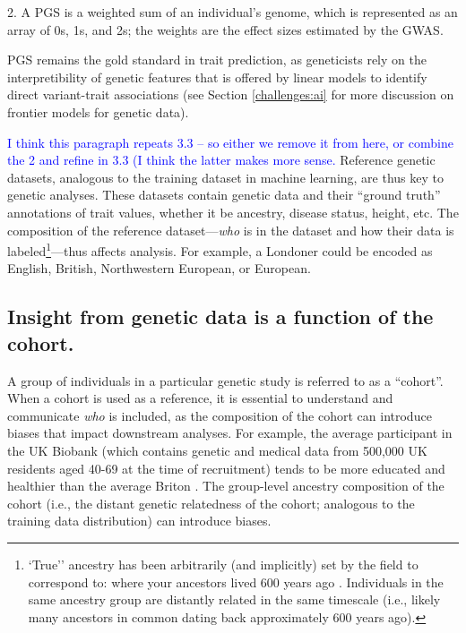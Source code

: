 2. A PGS is a weighted sum of an individual's genome, which is represented as an array of 0s, 1s, and 2s; the weights are the effect sizes estimated by the GWAS.

PGS remains the gold standard in trait prediction, as geneticists rely on the interpretibility of genetic features that is offered by linear models to identify direct variant-trait associations (see Section \ref{challenges:ai} for more discussion on frontier models for genetic data)\cite{fritzsche_ethical_2023}.



\textcolor{blue}{I think this paragraph repeats 3.3 -- so either we remove it from here, or combine the 2 and refine in 3.3 (I think the latter makes more sense.}  Reference genetic datasets, analogous to the training dataset in machine learning, are thus key to genetic analyses. These datasets contain genetic data and their ``ground truth'' annotations of trait values, whether it be ancestry, disease status, height, etc. The composition of the reference dataset—\emph{who} is in the dataset and how their data is labeled\footnote{`True'' ancestry has been arbitrarily (and implicitly) set by the field to correspond to: where your ancestors lived 600 years ago \cite{coop_genetic_2023}. Individuals in the same ancestry group are distantly related in the same timescale (i.e., likely many ancestors in common dating back approximately 600 years ago). }—thus affects analysis. For example, a Londoner could be encoded as English, British, Northwestern European, or European.



\subsection{Insight from genetic data is a function of the cohort.}

A group of individuals in a particular genetic study is referred to as a ``cohort''. When a cohort is used as a reference,  it is essential to understand and communicate \textit{who} is included, as the composition of the cohort can introduce biases that impact downstream analyses. For example, the average participant in the UK Biobank (which contains genetic and medical data from 500,000 UK residents aged 40-69 at the time of recruitment) tends to be more educated and healthier than the average Briton \cite{fry_comparison_2017}. The group-level ancestry composition of the cohort (i.e., the distant genetic relatedness of the cohort; analogous to the training data distribution) can introduce biases.



